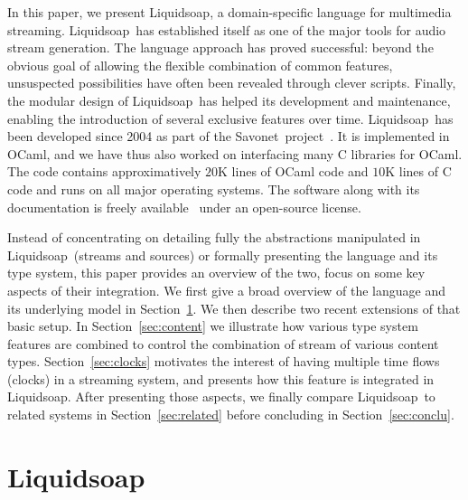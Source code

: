 \documentclass{llncs}
\newcommand{\liquidsoap}{Liquidsoap}
\newcommand{\savonet}{Savonet}
\begin{document}
In this paper, we present \liquidsoap, a domain-specific language for
multimedia streaming.
%
\liquidsoap\ has established itself as one of
the major tools for audio stream generation.
The language approach has proved successful:
beyond the obvious goal of allowing the flexible combination of
common features, unsuspected possibilities have often been revealed
through clever scripts.
Finally, the modular design of \liquidsoap\ has helped its development and
maintenance, enabling the introduction of several exclusive features
over time.
%
\liquidsoap\ has been developed since 2004
as part of the \savonet\ project~\cite{liquidsoap}.
It is implemented in OCaml,
and we have thus also worked on interfacing many C libraries for OCaml.
The code contains approximatively $20$K lines of OCaml code
and $10$K lines of C code and runs on all major operating systems.
The software along with its documentation is freely
available~\cite{liquidsoap} under an open-source license.
%

Instead of concentrating on detailing fully the abstractions
manipulated in \liquidsoap\ (streams and sources)
or formally presenting the language and its type system,
this paper provides an overview of the two, focus on some
key aspects of their integration.
We first give a broad
overview of the language and its underlying model in
Section~\ref{sec:liq}.
We then describe two recent extensions of that basic setup.
In Section~\ref{sec:content} we illustrate how various type system
features are combined to control the combination of stream
of various content types.
Section~\ref{sec:clocks} motivates
the interest of having multiple time flows (clocks)
in a streaming system, and presents how this feature is
integrated in \liquidsoap.
After presenting those aspects, we finally compare \liquidsoap\ to
related systems in Section~\ref{sec:related} before concluding
in Section~\ref{sec:conclu}.

\section{Liquidsoap}
\label{sec:liq}
\end{document}
